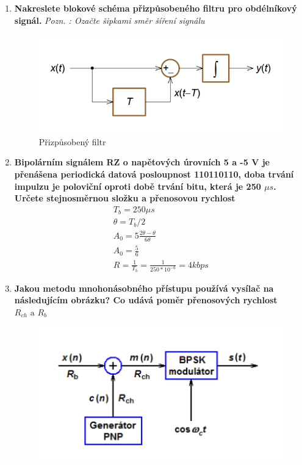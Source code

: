 \begin{enumerate}
    \item \textbf{Nakreslete blokové schéma přizpůsobeného filtru pro obdélníkový signál.} \textit{Pozn. : Ozačte šipkami směr šíření signálu}
    \begin{figure}[h!]
        \centering
        \includegraphics[scale=0.5]{images/prizfiltr.png}
        \caption{Přizpůsobený filtr}
        \label{fig:enter-label}
    \end{figure}
    \clearpage
    \item \textbf{Bipolárním signálem RZ o napětových úrovních 5 a -5 V je přenášena periodická datová posloupnost 110110110, doba trvání impulzu je poloviční oproti době trvání bitu, která je 250 $\mu s$. Určete stejnosměrnou složku a přenosovou rychlost} 
    \begin{gather*}
        T_b=250 \mu s \\
        \theta = T_b/2 \\
        A_0=5\frac{2\theta-\theta}{6\theta} \\
        A_0=\frac{5}{6} \\
        R=\frac{1}{T_b} = \frac{1}{250*10^{-6}} = 4kbps
    \end{gather*}
    \item \textbf{Jakou metodu mnohonásobného přístupu používá vysílač na následujícím obrázku? Co udává poměr přenosových rychlost $R_{ch} \textrm{ a } R_b$}
    \begin{figure}[h!]
        \centering
        \includegraphics{images/DS.png}
        \label{fig:enter-label}
    \end{figure}
    

\end{enumerate}
